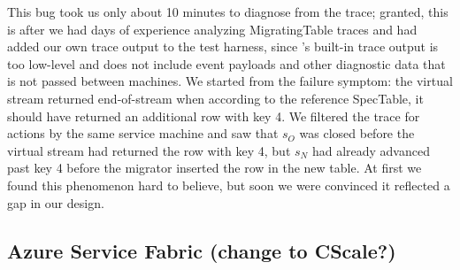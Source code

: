 This bug took us only about 10 minutes to diagnose from the trace; granted, this is after we had days of experience analyzing MigratingTable traces and had added our own trace output to the test harness, since \psharp's built-in trace output is too low-level and does not include event payloads and other diagnostic data that is not passed between machines.  We started from the failure symptom: the virtual stream returned end-of-stream when according to the reference SpecTable, it should have returned an additional row with key 4.  We filtered the trace for actions by the same service machine and saw that $s_O$ was closed before the virtual stream had returned the row with key 4, but $s_N$ had already advanced past key 4 before the migrator inserted the row in the new table.  At first we found this phenomenon hard to believe, but soon we were convinced it reflected a gap in our design.


\subsection{Azure Service Fabric (change to CScale?)}
\label{sec:cases:fabric}


